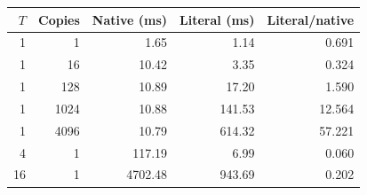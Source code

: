 \begin{center}
\begin{tabular}{rrrrr}
\toprule
$T$ & Copies & Native (ms) & Literal (ms) & Literal/native \\
\midrule
1 & 1 & 1.65 & 1.14 & 0.691 \\
1 & 16 & 10.42 & 3.35 & 0.324 \\
1 & 128 & 10.89 & 17.20 & 1.590 \\
1 & 1024 & 10.88 & 141.53 & 12.564 \\
1 & 4096 & 10.79 & 614.32 & 57.221 \\
4 & 1 & 117.19 & 6.99 & 0.060 \\
16 & 1 & 4702.48 & 943.69 & 0.202 \\
\bottomrule
\end{tabular}
\end{center}
